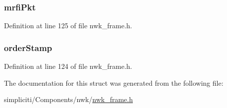 \hypertarget{structframeInfo__t_ac7a6c4fea11f56eda913e5c5b1092aa5}{
\subsubsection[{mrfi\-Pkt}]{ {\bf mrfi\-Pkt}}}\label{structframeInfo__t_ac7a6c4fea11f56eda913e5c5b1092aa5}


\-Definition at line 125 of file nwk\-\_\-frame.\-h.

\hypertarget{structframeInfo__t_a67b3ffbf7c3dc9ca9c1b6399c3e478a1}{
\subsubsection[{order\-Stamp}]{ {\bf order\-Stamp}}}\label{structframeInfo__t_a67b3ffbf7c3dc9ca9c1b6399c3e478a1}


\-Definition at line 124 of file nwk\-\_\-frame.\-h.



\-The documentation for this struct was generated from the following file\-:\begin{DoxyCompactItemize}
\item 
simpliciti/\-Components/nwk/\hyperlink{nwk__frame_8h}{nwk\-\_\-frame.\-h}\end{DoxyCompactItemize}
